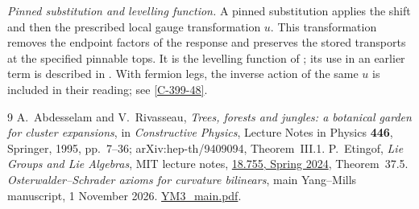 \documentclass[11pt,letterpaper,reqno]{amsart}
\theoremstyle{definition}
\theoremstyle{remark}
\begin{document}
\emph{Pinned substitution and levelling function.}
A pinned substitution applies the shift and then the prescribed
local gauge transformation $u$. This transformation removes
the endpoint factors of the response and preserves the stored
transports at the specified pinnable tops. It is the levelling
function of \cite[\S4.15.6]{YMM1}; its use in an earlier
term is described in \cite[\S4.15.9]{YMM1}.
With fermion legs, the inverse action of the same $u$ is
included in their reading; see \cref{C-399-48}.

\begin{thebibliography}{9}
A.~Abdesselam and V.~Rivasseau,
\emph{Trees, forests and jungles: a botanical garden for cluster expansions},
in \emph{Constructive Physics}, Lecture Notes in Physics \textbf{446},
Springer, 1995, pp.~7--36; arXiv:hep-th/9409094, Theorem~III.1.
P.~Etingof, \emph{Lie Groups and Lie Algebras}, MIT lecture notes,
\href{https://ocw.mit.edu/courses/18-755-lie-groups-and-lie-algebras-ii-spring-2024/mit18_755_s24_lec_full.pdf}{18.755, Spring 2024}, Theorem~37.5.
\emph{Osterwalder--Schrader axioms for curvature bilinears},
main Yang--Mills manuscript, 1 November 2026.
\href{https://github.com/ethanwsussman/Yang--Mills-LLM-experiment/blob/main/YM3/YM3_main.pdf}{YM3\_main.pdf}.
\end{thebibliography}
\end{document}
